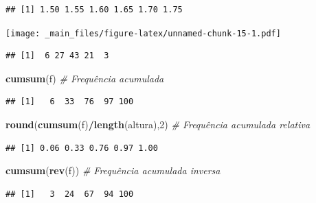 \documentclass[
]{book}
\newenvironment{Shaded}{\begin{snugshade}}{\end{snugshade}}
\newcommand{\CommentTok}[1]{\textcolor[rgb]{0.56,0.35,0.01}{\textit{#1}}}
\newcommand{\DecValTok}[1]{\textcolor[rgb]{0.00,0.00,0.81}{#1}}
\newcommand{\KeywordTok}[1]{\textcolor[rgb]{0.13,0.29,0.53}{\textbf{#1}}}
\newcommand{\NormalTok}[1]{#1}
\newcommand{\OperatorTok}[1]{\textcolor[rgb]{0.81,0.36,0.00}{\textbf{#1}}}
\newcommand{\StringTok}[1]{\textcolor[rgb]{0.31,0.60,0.02}{#1}}
\theoremstyle{definition}
\theoremstyle{definition}
\theoremstyle{definition}
\theoremstyle{remark}
\begin{document}
\begin{verbatim}
## [1] 1.50 1.55 1.60 1.65 1.70 1.75
\end{verbatim}

\begin{Shaded}
\end{Shaded}

\texttt{[image: \_main\_files/figure-latex/unnamed-chunk-15-1.pdf]}

\begin{verbatim}
## [1]  6 27 43 21  3
\end{verbatim}

\begin{Shaded}
\begin{Highlighting}[]
\KeywordTok{cumsum}\NormalTok{(f)                                 }\CommentTok{\# Frequência acumulada}
\end{Highlighting}
\end{Shaded}

\begin{verbatim}
## [1]   6  33  76  97 100
\end{verbatim}

\begin{Shaded}
\begin{Highlighting}[]
\KeywordTok{round}\NormalTok{(}\KeywordTok{cumsum}\NormalTok{(f)}\OperatorTok{/}\KeywordTok{length}\NormalTok{(altura),}\DecValTok{2}\NormalTok{)         }\CommentTok{\# Frequência acumulada relativa}
\end{Highlighting}
\end{Shaded}

\begin{verbatim}
## [1] 0.06 0.33 0.76 0.97 1.00
\end{verbatim}

\begin{Shaded}
\begin{Highlighting}[]
\KeywordTok{cumsum}\NormalTok{(}\KeywordTok{rev}\NormalTok{(f))                            }\CommentTok{\# Frequência acumulada inversa}
\end{Highlighting}
\end{Shaded}

\begin{verbatim}
## [1]   3  24  67  94 100
\end{verbatim}
\end{document}
